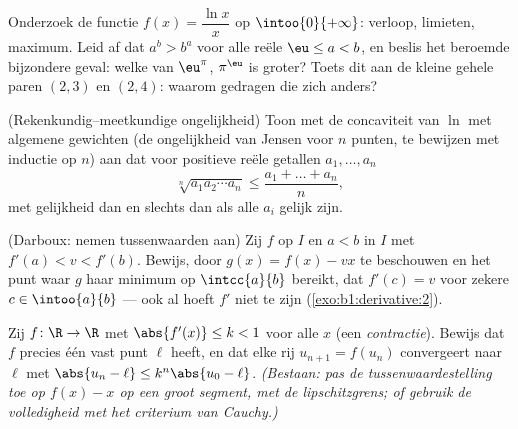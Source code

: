 \begin{exercise}[$\star\star$]\label{exo:b1:derivative:8}
Onderzoek de functie $f(x) = \dfrac{\ln x}{x}$ op
$\intoo{0}{+\infty}$: verloop, limieten, maximum. Leid af dat $a^b >
b^a$ voor alle reële $\eu \leq a < b$, en beslis het beroemde
bijzondere geval: welke van $\eu^\pi$, $\pi^\eu$ is groter? Toets
dit aan de kleine gehele paren $(2,3)$ en $(2,4)$: waarom gedragen
die zich anders?
\end{exercise}

\begin{exercise}[$\star\star$]\label{exo:b1:derivative:9}
(Rekenkundig--meetkundige ongelijkheid) Toon met de concaviteit van
$\ln$ met algemene gewichten (de ongelijkheid van Jensen voor $n$
punten, te bewijzen met inductie op $n$) aan dat voor positieve
reële getallen $a_1, \dots, a_n$
\[
\sqrt[n]{a_1 a_2 \cdots a_n} \leq \frac{a_1 + \dots + a_n}{n},
\]
met gelijkheid dan en slechts dan als alle $a_i$ gelijk zijn.
\end{exercise}

\begin{exercise}[$\star\star\star$]\label{exo:b1:derivative:10}
(Darboux:  nemen tussenwaarden aan) Zij $f$  op
$I$ en $a < b$ in $I$ met $f'(a) < v < f'(b)$. Bewijs, door $g(x) =
f(x) - vx$ te beschouwen en het punt waar $g$ haar minimum op
$\intcc{a}{b}$ bereikt, dat $f'(c) = v$ voor zekere $c \in
\intoo{a}{b}$ --- ook al hoeft $f'$ niet  te zijn
(\cref{exo:b1:derivative:2}).
\end{exercise}

\begin{exercise}[$\star\star\star$]\label{exo:b1:derivative:11}
Zij $f \colon \R \to \R$  met $\abs{f'(x)} \leq k < 1$
voor alle $x$ (een \emph{contractie}). Bewijs dat $f$ precies één
vast punt $\ell$ heeft, en dat elke rij $u_{n+1} = f(u_n)$
convergeert naar $\ell$ met $\abs{u_n - \ell} \leq k^n\abs{u_0 -
\ell}$. \emph{(Bestaan: pas de tussenwaardestelling toe op $f(x) -
x$ op een groot segment, met de lipschitzgrens; of gebruik de
volledigheid met het criterium van Cauchy.)}
\end{exercise}

